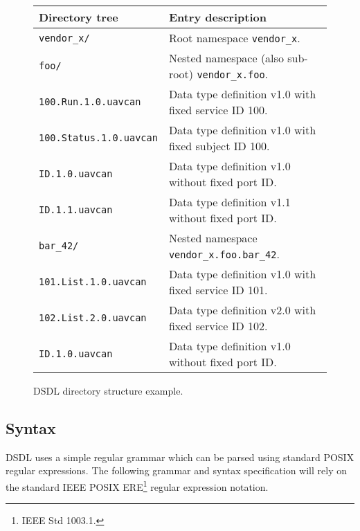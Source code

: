 \begin{figure}[H]
    \begin{tabu}{|l|X|} \hline
        \rowfont{\bfseries}
        Directory tree & Entry description \\\hline

        \texttt{vendor\_x/} &
        Root namespace \texttt{vendor\_x}. \\

        \texttt{\qquad{}foo/} &
        Nested namespace (also sub-root) \texttt{vendor\_x.foo}. \\

        \texttt{\qquad{}\qquad{}100.Run.1.0.uavcan} &
        Data type definition v1.0 with fixed service ID 100. \\

        \texttt{\qquad{}\qquad{}100.Status.1.0.uavcan} &
        Data type definition v1.0 with fixed subject ID 100. \\

        \texttt{\qquad{}\qquad{}ID.1.0.uavcan} &
        Data type definition v1.0 without fixed port ID. \\

        \texttt{\qquad{}\qquad{}ID.1.1.uavcan} &
        Data type definition v1.1 without fixed port ID. \\

        \texttt{\qquad{}\qquad{}bar\_42/} &
        Nested namespace \texttt{vendor\_x.foo.bar\_42}. \\

        \texttt{\qquad{}\qquad{}\qquad{}101.List.1.0.uavcan} &
        Data type definition v1.0 with fixed service ID 101. \\

        \texttt{\qquad{}\qquad{}\qquad{}102.List.2.0.uavcan} &
        Data type definition v2.0 with fixed service ID 102. \\

        \texttt{\qquad{}\qquad{}\qquad{}ID.1.0.uavcan} &
        Data type definition v1.0 without fixed port ID. \\\hline
    \end{tabu}
    \caption{DSDL directory structure example.}\label{fig:dsdl_directory_structure_example}
\end{figure}

\subsection{Syntax}

DSDL uses a simple regular grammar which can be parsed using standard POSIX regular expressions.
The following grammar and syntax specification will rely on the standard IEEE POSIX ERE\footnote{IEEE Std 1003.1.}
regular expression notation.



